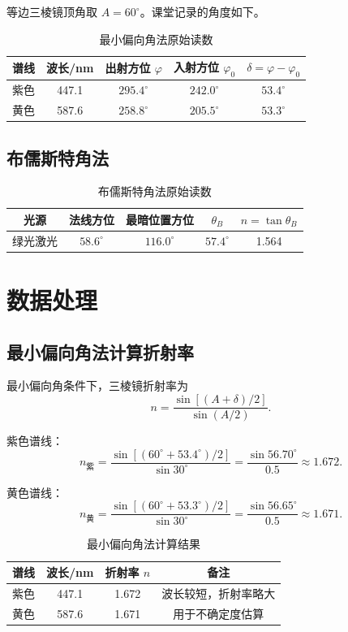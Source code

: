\documentclass[UTF8,12pt,a4paper]{ctexart}
\begin{document}
等边三棱镜顶角取 \(A=60^\circ\)。课堂记录的角度如下。

\begin{table}[H]
\centering
\caption{最小偏向角法原始读数}
\small
\begin{tabular}{ccccc}
\toprule
谱线 & 波长/nm & 出射方位 \(\varphi\) & 入射方位 \(\varphi_0\) & \(\delta=\varphi-\varphi_0\) \\
\midrule
紫色 & 447.1 & \(295.4^\circ\) & \(242.0^\circ\) & \(53.4^\circ\) \\
黄色 & 587.6 & \(258.8^\circ\) & \(205.5^\circ\) & \(53.3^\circ\) \\
\bottomrule
\end{tabular}
\end{table}

\subsection{布儒斯特角法}

\begin{table}[H]
\centering
\caption{布儒斯特角法原始读数}
\small
\begin{tabular}{ccccc}
\toprule
光源 & 法线方位 & 最暗位置方位 & \(\theta_B\) & \(n=\tan\theta_B\) \\
\midrule
绿光激光 & \(58.6^\circ\) & \(116.0^\circ\) & \(57.4^\circ\) & 1.564 \\
\bottomrule
\end{tabular}
\end{table}

\section{数据处理}

\subsection{最小偏向角法计算折射率}

最小偏向角条件下，三棱镜折射率为
\[
    n=\frac{\sin[(A+\delta)/2]}{\sin(A/2)} .
\]

紫色谱线：
\[
 n_{\text{紫}}=
 \frac{\sin[(60^\circ+53.4^\circ)/2]}{\sin30^\circ}
 =\frac{\sin56.70^\circ}{0.5}
 \approx 1.672 .
\]

黄色谱线：
\[
 n_{\text{黄}}=
 \frac{\sin[(60^\circ+53.3^\circ)/2]}{\sin30^\circ}
 =\frac{\sin56.65^\circ}{0.5}
 \approx 1.671 .
\]

\begin{table}[H]
\centering
\caption{最小偏向角法计算结果}
\small
\begin{tabular}{cccc}
\toprule
谱线 & 波长/nm & 折射率 \(n\) & 备注 \\
\midrule
紫色 & 447.1 & 1.672 & 波长较短，折射率略大 \\
黄色 & 587.6 & 1.671 & 用于不确定度估算 \\
\bottomrule
\end{tabular}
\end{table}
\end{document}
